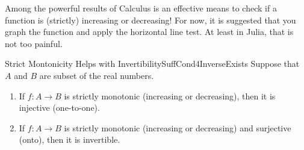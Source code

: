 \begin{rem} Among the powerful results of Calculus is an effective means to check if a function is (strictly) increasing or decreasing! For now, it is suggested that you graph the function and apply the horizontal line test.  At least in Julia, that is not too painful.    
\end{rem}



\bigskip

\begin{propColor}{Strict Montonicity Helps with Invertibility}{SuffCond4InverseExists}
 Suppose that $A$ and $B$ are subset of the real numbers.
\begin{enumerate}
\renewcommand{\labelenumi}{(\alph{enumi})}
\setlength{\itemsep}{.2cm}
    \item If $f:A \to B$ is strictly monotonic (increasing or decreasing), then it is injective (one-to-one).

    \item If $f:A \to B$ is strictly monotonic (increasing or decreasing) and surjective (onto), then it is invertible.
\end{enumerate} 
    
\end{propColor}

\bigskip

